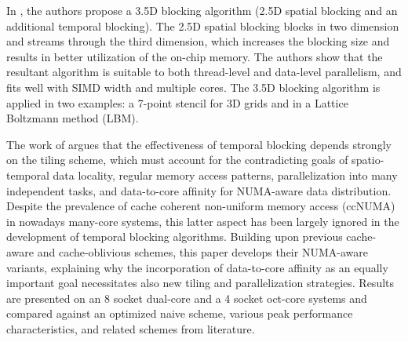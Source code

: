 \documentclass[conference]{IEEEtran}
\begin{document}

In \cite{nguyen}, the authors propose a 3.5D blocking algorithm (2.5D spatial blocking and an additional temporal blocking). The 2.5D spatial blocking blocks in two dimension and streams through the third dimension, which increases the blocking size and results in better utilization of the on-chip memory. The authors show that the resultant algorithm is suitable to both thread-level and data-level parallelism, and fits well with SIMD width and multiple cores. The 3.5D blocking algorithm is applied in two examples: a 7-point stencil for 3D grids and in a Lattice Boltzmann method (LBM). 

The work of \cite{shaheen} argues that the effectiveness of temporal blocking depends strongly on the tiling scheme, which must account for the contradicting goals of spatio-temporal data locality, regular memory access patterns, parallelization into many independent tasks, and data-to-core afﬁnity for NUMA-aware data distribution. Despite the prevalence of cache coherent non-uniform memory access (ccNUMA) in nowadays many-core systems, this latter aspect has been largely ignored in the development of temporal blocking algorithms. Building upon previous cache-aware and cache-oblivious schemes, this paper develops their NUMA-aware variants, explaining why the incorporation of data-to-core affinity as an equally important goal necessitates also new tiling and parallelization strategies. Results are presented on an 8 socket dual-core and a 4 socket oct-core systems and compared against an optimized naive scheme, various peak performance characteristics, and related schemes from literature.
\end{document}
